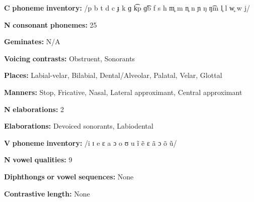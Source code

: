 \begin{styleBody}
\textbf{C} \textbf{phoneme} \textbf{inventory:} /p b t d c ɟ k ɡ k͡p ɡ͡b f s h m̥ m n̥ n ɲ ŋ ŋ͡m l̥ l w̥ w j/
\end{styleBody}

\begin{styleBody}
\textbf{N} \textbf{consonant} \textbf{phonemes:} 25
\end{styleBody}

\begin{styleBody}
\textbf{Geminates:} N/A
\end{styleBody}

\begin{styleBody}
\textbf{Voicing} \textbf{contrasts:} Obstruent, Sonorants
\end{styleBody}

\begin{styleBody}
\textbf{Places:} Labial-velar, Bilabial, Dental/Alveolar, Palatal, Velar, Glottal
\end{styleBody}

\begin{styleBody}
\textbf{Manners:} Stop, Fricative, Nasal, Lateral approximant, Central approximant
\end{styleBody}

\begin{styleBody}
\textbf{N} \textbf{elaborations:} 2
\end{styleBody}

\begin{styleBody}
\textbf{Elaborations:} Devoiced sonorants, Labiodental
\end{styleBody}

\begin{styleBody}
\textbf{V} \textbf{phoneme} \textbf{inventory:} /i ɪ e ɛ a ɔ o ʊ u ĩ ẽ ɛ ã ɔ õ ũ/
\end{styleBody}

\begin{styleBody}
\textbf{N} \textbf{vowel} \textbf{qualities:} 9
\end{styleBody}

\begin{styleBody}
\textbf{Diphthongs} \textbf{or} \textbf{vowel} \textbf{sequences:} None
\end{styleBody}

\begin{styleBody}
\textbf{Contrastive} \textbf{length:} None
\end{styleBody}

